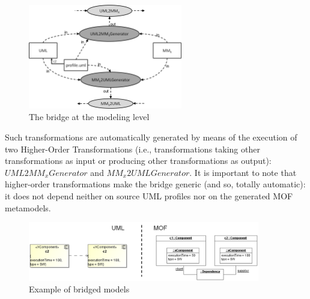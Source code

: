 %
\begin{figure}[htbp]
	\centering
	\includegraphics[width=0.60\textwidth]{figures/modelingLevel.png}
	\caption{The bridge at the modeling level}
	\label{fig:modelingLevel}
\end{figure}
\vspace{-.6cm}
Such transformations are automatically generated by means of the execution of two Higher-Order Transformations
(i.e., transformations taking other transformations as input or producing
other transformations as output): $UML2MM_xGenerator$ and $MM_x2UMLGenerator$. It is important to note that higher-order transformations make the bridge generic (and so, totally automatic): it does not depend neither on source UML profiles nor on the generated MOF metamodels.
\vspace{-.3cm}
\begin{figure}[htbp]
	\centering
		\includegraphics[width=0.90\textwidth]{figures/modelingExample.png}
	\caption{Example of bridged models}
	\label{fig:modelingExample}
\end{figure}
\vspace{-1cm}



